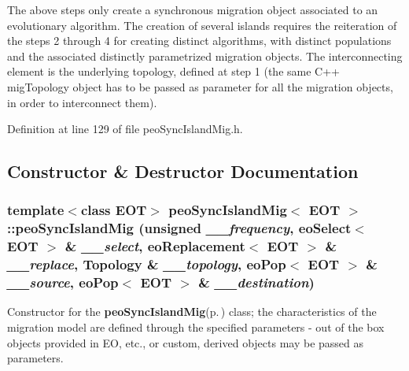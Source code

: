The above steps only create a synchronous migration object associated to an evolutionary algorithm. The creation of several islands requires the reiteration of the steps 2 through 4 for creating distinct algorithms, with distinct populations and the associated distinctly parametrized migration objects. The interconnecting element is the underlying topology, defined at step 1 (the same C++ mig\-Topology object has to be passed as parameter for all the migration objects, in order to interconnect them). 



Definition at line 129 of file peo\-Sync\-Island\-Mig.h.

\subsection{Constructor \& Destructor Documentation}
\subsubsection{\setlength{\rightskip}{0pt plus 5cm}template$<$class EOT$>$ {\bf peo\-Sync\-Island\-Mig}$<$ EOT $>$::{\bf peo\-Sync\-Island\-Mig} (unsigned {\em \_\-\_\-frequency}, eo\-Select$<$ EOT $>$ \& {\em \_\-\_\-select}, eo\-Replacement$<$ EOT $>$ \& {\em \_\-\_\-replace}, {\bf Topology} \& {\em \_\-\_\-topology}, eo\-Pop$<$ EOT $>$ \& {\em \_\-\_\-source}, eo\-Pop$<$ EOT $>$ \& {\em \_\-\_\-destination})}\label{classpeo_sync_island_mig_96b7b6de20b5e318a8b1cde76842305c}


Constructor for the {\bf peo\-Sync\-Island\-Mig}{\rm (p.\,\pageref{classpeo_sync_island_mig})} class; the characteristics of the migration model are defined through the specified parameters - out of the box objects provided in EO, etc., or custom, derived objects may be passed as parameters. 

